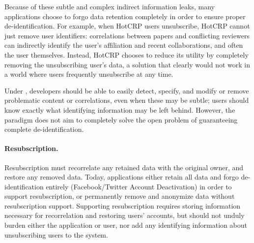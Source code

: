 Because of these subtle and complex indirect information leaks, many applications choose to forgo
data retention completely in order to ensure proper de-identification. For example, when HotCRP
users unsubscribe, 
HotCRP cannot just remove user identifiers: correlations between papers and conflicting  reviewers
can indirectly identify the user's affiliation and recent collaborations, and often the user
themselves. Instead, HotCRP chooses to reduce its utility by completely removing the unsubscribing
user's data, a solution that clearly would not work in a world where users frequently unsubscribe at
any time.

Under \sys, developers should be able to easily detect, specify, and modify or remove problematic
content or correlations, even when these may be subtle; users should know exactly what identifying
information may be left behind. However, the \sys paradigm does not aim to completely solve the open
problem of guaranteeing complete de-identification.

\paragraph{Resubscription.}
Resubscription must recorrelate any retained data with the original owner, and restore any removed
data. Today, applications either retain all data and forgo de-identification entirely
(Facebook/Twitter Account Deactivation) in order to support resubscription, or permanently remove
and anonymize data without resubscription support. Supporting resubscription requires storing
information necessary for recorrelation and restoring users' accounts, but should not unduly burden
either the application or user, nor add any identifying information about unsubscribing users to the
system.

%


